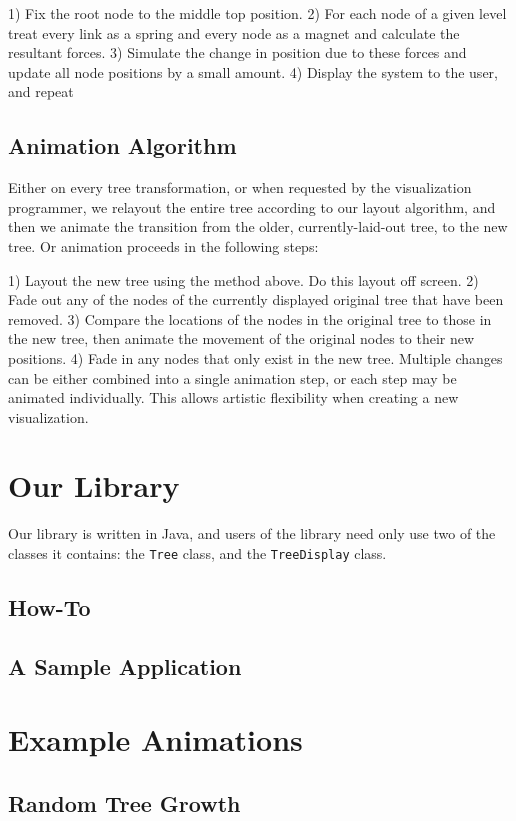 \documentclass{article}
\newcommand{\java}[1]{\texttt{#1}\index{#1}}
\begin{document}
1) Fix the root node to the middle top position. 
2) For each node of a given level treat every 
link as a spring and every node as a magnet 
and calculate the resultant forces. 
3) Simulate the change in position due to 
these forces and update all node positions 
by a small amount. 
4) Display the system to the user, and repeat 

\subsection{Animation Algorithm}

Either on every tree transformation, or when requested by the visualization programmer, we relayout the entire tree according to our layout algorithm, and then we animate the transition from the older, currently-laid-out tree, to the new tree.  Or animation proceeds in the following steps:

1) Layout the new tree using the method above. 
Do this layout off screen. 
2) Fade out any of the nodes of the currently 
displayed original tree that have been removed. 
3) Compare the locations of the nodes in the 
original tree to those in the new tree, then 
animate the movement of the original nodes 
to their new positions. 
4) Fade in any nodes that only exist in the 
new tree. 
Multiple changes can be either combined into a 
single animation step, or each step may be 
animated individually.  This allows artistic flexibility 
when creating a new visualization. 

\section{Our Library}

Our library is written in Java, and users of the library need only use two of the classes it contains: the \java{Tree} class, and the \java{TreeDisplay} class.  

\subsection{How-To}
\subsection{A Sample Application}

\section{Example Animations}
\subsection{Random Tree Growth}
\end{document}
